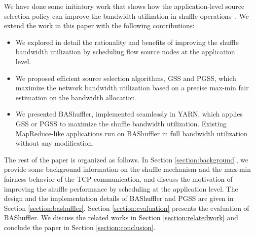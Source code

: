 \documentclass[10pt,journal,compsoc]{IEEEtran}
\begin{document}
We have done some initiatory work that shows how the application-level source selection policy can improve the bandwidth utilization in shuffle operations~\cite{Liang:2016:BMN}. We extend the work in this paper with the following contributions:
\begin{itemize}
\setlength{\itemsep}{0pt}
\setlength{\parskip}{0pt}
\setlength{\parsep}{0pt}
\item We 
explored in detail the rationality and benefits 
of improving the shuffle bandwidth utilization by scheduling flow source nodes at the application level.

\item We proposed efficient source selection algorithms, GSS and PGSS,
which maximize the network bandwidth utilization based on a precise 
max-min fair estimation on the bandwidth allocation. 

\item We presented BAShuffler, implemented seamlessly in YARN,  
which applies GSS or PGSS to maximize the shuffle bandwidth utilization. 
Existing MapReduce-like applications run on BAShuffler in full bandwidth utilization without any modification.

% 
\end{itemize}


The rest of the paper is organized as follows.
In Section \ref{section:background}, we provide some background information on the shuffle mechanism
and the max-min fairness behavior of the TCP communication, and discuss the motivation of improving the shuffle performance by scheduling at the application level.
The design and the implementation details of BAShuffler and PGSS
are given in Section \ref{section:bashuffler}.
Section \ref{section:evaluation} presents the evaluation of BAShuffler.
We discuss the related works in Section \ref{section:relatedwork} and
conclude the paper in Section \ref{section:conclusion}. 
\end{document}
